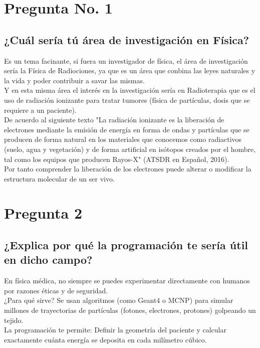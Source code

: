 \documentclass[12pt]{article}
\begin{document}
\section{Pregunta No. 1}
\subsection{¿Cuál sería tú área de investigación en Física?}

Es un tema facinante, si fuera un investigador  de física, el área de investigación sería la Física de Radiociones, ya que es un área que conbina las leyes naturales y la vida y poder contribuir a savar las mismas.\\
 Y en esta misma área el interés en la investigación sería en Radioterapia que es el uso de radiación ionizante para tratar tumores (física de partículas, dosis que se requiere a un paciente).\\
 De acuerdo al siguiente texto "La radiación ionizante es la liberación de electrones mediante la emisión de energía en forma de ondas y partículas que se producen de forma natural en los materiales que conocemos como radiactivos (suelo, agua y vegetación) y de forma artificial en isótopos creados por el hombre, tal como los equipos que producen Rayos-X" (ATSDR en Español, 2016).\\
Por tanto comprender la liberación de los electrones puede alterar o modificar la estructura molecular de un ser vivo.


\section{Pregunta 2}
\subsection{¿Explica por qué la programación te sería útil en dicho campo?}

En física médica, no siempre se puedes experimentar directamente con humanos por razones éticas y de seguridad.\\

¿Para qué sirve? Se usan algoritmos (como Geant4 o MCNP) para simular millones de trayectorias de partículas (fotones, electrones, protones) golpeando un tejido.\\

La programación te permite: Definir la geometría del paciente y calcular exactamente cuánta energía se deposita en cada milímetro cúbico.
\end{document}
